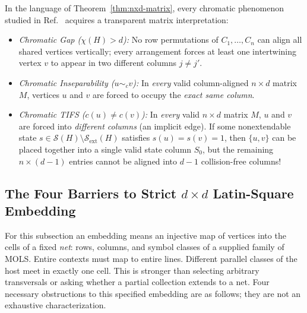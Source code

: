 \documentclass[aps,pra,reprint,superscriptaddress,longbibliography,nofootinbib,floatfix,10pt]{revtex4-2}
\theoremstyle{definition}\newtheorem{definition}[theorem]{Definition}
\theoremstyle{remark}\newtheorem{remark}[theorem]{Remark}
\newcommand{\Sc}{\mathcal S}\newcommand{\Cc}{\mathcal C}
\begin{document}
In the language of Theorem~\ref{thm:nxd-matrix}, every chromatic phenomenon studied in Ref.~\cite{svozil2026contexts} acquires a transparent matrix interpretation:
\begin{itemize}
\item \emph{Chromatic Gap ($\chi(H)>d$):} No row permutations of $C_1,\ldots,C_n$ can align all shared vertices vertically; every arrangement forces at least one intertwining vertex $v$ to appear in two different columns $j\neq j'$.
\item \emph{Chromatic Inseparability ($u\sim_c v$):} In \emph{every} valid column-aligned $n\times d$ matrix $M$, vertices $u$ and $v$ are forced to occupy the \emph{exact same column}.
\item \emph{Chromatic TIFS ($c(u)\neq c(v)$):} In \emph{every} valid $n\times d$ matrix $M$, $u$ and $v$ are forced into \emph{different columns} (an implicit edge). If some nonextendable state $s\in\Sc(H)\setminus\Sc_{\mathrm{ext}}(H)$ satisfies $s(u)=s(v)=1$, then $\{u,v\}$ can be placed together into a single valid state column $S_0$, but the remaining $n\times(d-1)$ entries cannot be aligned into $d-1$ collision-free columns!
\end{itemize}

\subsection{The Four Barriers to Strict \texorpdfstring{$d\times d$}{d x d} Latin-Square Embedding}\label{sec:barriers}

For this subsection an embedding means an injective map of vertices into the cells of a fixed \emph{net}: rows, columns, and symbol classes of a supplied family of MOLS. Entire contexts must map to entire lines. Different parallel classes of the host meet in exactly one cell. This is stronger than selecting arbitrary transversals or asking whether a partial collection extends to a net. Four necessary obstructions to this specified embedding are as follows; they are not an exhaustive characterization.
\end{document}
